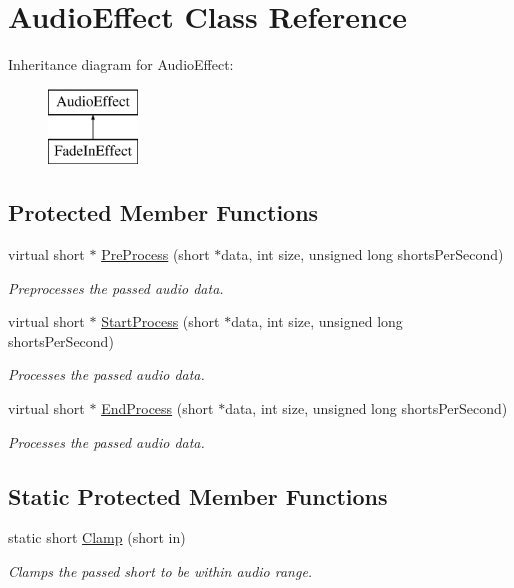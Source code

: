 \hypertarget{class_audio_effect}{}\section{Audio\+Effect Class Reference}
\label{class_audio_effect}
Inheritance diagram for Audio\+Effect\+:\begin{figure}[H]
\begin{center}
\leavevmode
\includegraphics[height=2.000000cm]{class_audio_effect}
\end{center}
\end{figure}
\subsection*{Protected Member Functions}
\begin{DoxyCompactItemize}
\item 
virtual short $\ast$ \hyperlink{class_audio_effect_aa3ef3fe6eb855581fff9db8b69de37cf}{Pre\+Process} (short $\ast$data, int size, unsigned long shorts\+Per\+Second)
\begin{DoxyCompactList}\small\item\em Preprocesses the passed audio data. \end{DoxyCompactList}\item 
virtual short $\ast$ \hyperlink{class_audio_effect_a2b6c7b17eddb589170c977f2d6dc0ec6}{Start\+Process} (short $\ast$data, int size, unsigned long shorts\+Per\+Second)
\begin{DoxyCompactList}\small\item\em Processes the passed audio data. \end{DoxyCompactList}\item 
virtual short $\ast$ \hyperlink{class_audio_effect_aa281bd543b2841eeab97e7f23bed8889}{End\+Process} (short $\ast$data, int size, unsigned long shorts\+Per\+Second)
\begin{DoxyCompactList}\small\item\em Processes the passed audio data. \end{DoxyCompactList}\end{DoxyCompactItemize}
\subsection*{Static Protected Member Functions}
\begin{DoxyCompactItemize}
\item 
static short \hyperlink{class_audio_effect_a206794f66b9e0ca2cde69e970f3f398d}{Clamp} (short in)
\begin{DoxyCompactList}\small\item\em Clamps the passed short to be within audio range. \end{DoxyCompactList}\end{DoxyCompactItemize}
